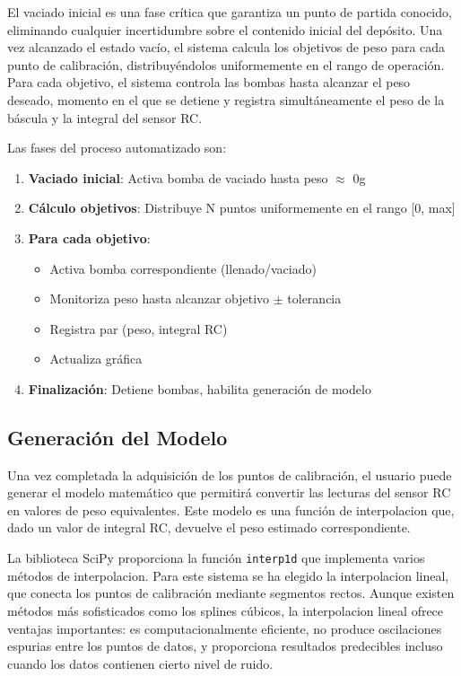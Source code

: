 \documentclass[12pt,a4paper]{article}
\begin{document}
El vaciado inicial es una fase crítica que garantiza un punto de partida conocido, eliminando cualquier incertidumbre sobre el contenido inicial del depósito. Una vez alcanzado el estado vacío, el sistema calcula los objetivos de peso para cada punto de calibración, distribuyéndolos uniformemente en el rango de operación. Para cada objetivo, el sistema controla las bombas hasta alcanzar el peso deseado, momento en el que se detiene y registra simultáneamente el peso de la báscula y la integral del sensor RC.

Las fases del proceso automatizado son:

\begin{enumerate}
    \item \textbf{Vaciado inicial}: Activa bomba de vaciado hasta peso $\approx$ 0g
    \item \textbf{Cálculo objetivos}: Distribuye N puntos uniformemente en el rango [0, max]
    \item \textbf{Para cada objetivo}:
    \begin{itemize}
        \item Activa bomba correspondiente (llenado/vaciado)
        \item Monitoriza peso hasta alcanzar objetivo $\pm$ tolerancia
        \item Registra par (peso, integral RC)
        \item Actualiza gráfica
    \end{itemize}
    \item \textbf{Finalización}: Detiene bombas, habilita generación de modelo
\end{enumerate}

\subsection{Generación del Modelo}

Una vez completada la adquisición de los puntos de calibración, el usuario puede generar el modelo matemático que permitirá convertir las lecturas del sensor RC en valores de peso equivalentes. Este modelo es una función de interpolacion que, dado un valor de integral RC, devuelve el peso estimado correspondiente.

La biblioteca SciPy proporciona la función \texttt{interp1d} que implementa varios métodos de interpolacion. Para este sistema se ha elegido la interpolacion lineal, que conecta los puntos de calibración mediante segmentos rectos. Aunque existen métodos más sofisticados como los splines cúbicos, la interpolacion lineal ofrece ventajas importantes: es computacionalmente eficiente, no produce oscilaciones espurias entre los puntos de datos, y proporciona resultados predecibles incluso cuando los datos contienen cierto nivel de ruido.
\end{document}
